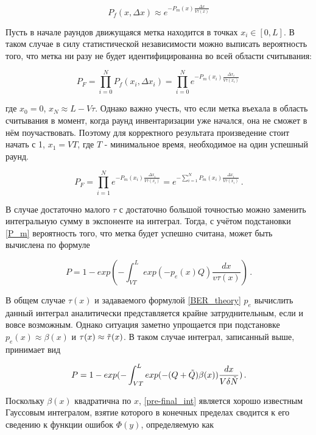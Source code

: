 \documentclass[12pt]{article}
\theoremstyle{definition}
\begin{document}
\begin{equation}
    P_f(x,\Delta x) \approx e^{-P_m(x)\frac{\Delta x}{V\tau(x)}}
\end{equation}

Пусть в начале раундов движущаяся метка находится в точках $x_i\in[0,L]$. В таком случае в силу статистической независимости можно выписать вероятность того, что метка ни разу не будет идентифицированна во всей области считывания:

\begin{equation}
    P_F=\prod_{i=0}^N P_f(x_i,\Delta x_i) = \prod_{i=0}^N e^{-P_m(x_i)\frac{\Delta x_i}{V\tau(x_i)}}\,
\end{equation}

где $x_0 = 0$, $x_N\approx L-V\tau$. Однако важно учесть, что если метка въехала в область считывания в момент, когда раунд инвентаризации уже начался, она не сможет в нём поучаствовать. Поэтому для корректного результата произведение стоит начать с 1, $x_1=VT$, где $T$ - минимальное время, необходимое на один успешный раунд. 

\begin{equation}
    P_F = \prod_{i=1}^N e^{-P_m(x_i)\frac{\Delta x_i}{V\tau(x_i)}} = e^{-\sum_{i=1}^N P_m(x_i)\frac{\Delta x_i}{V\tau(x_i)}}\,.
\end{equation}

В случае достаточно малого $\tau$ с достаточно большой точностью можно заменить интегральную сумму в экспоненте на интеграл. Тогда, с учётом подстановки \eqref{P_m} вероятность того, что метка будет успешно считана, может быть вычислена по формуле 

\begin{equation}
\label{prob_integral}
    P = 1 - exp(-\int_{VT}^L exp(-p_e(x)Q)\frac{dx}{v\tau(x)})\,.
\end{equation}

В общем случае $\tau(x)$ и задаваемого формулой \eqref{BER_theory} $p_e$ вычислить данный интеграл аналитически представляется крайне затруднительным, если и вовсе возможным. Однако ситуация заметно упрощается при подстановке $p_e(x)\approx\beta(x)$ и $\tau(x)\approx\Tilde{\tau}(x)$. В таком случае интеграл, записанный выше, принимает вид

\begin{equation}
\label{pre-final_int}
    P = 1 - exp(-\int_{VT}^L exp(-(Q+\Tilde{Q})\beta(x))\frac{dx}{V\delta\Tilde{N}})\,.
\end{equation}

Поскольку $\beta(x)$ квадратична по $x$, \eqref{pre-final_int} является хорошо известным Гауссовым интегралом, взятие которого в конечных пределах сводится к его сведению к функции ошибок $\Phi(y)$, определяемую как
\end{document}
